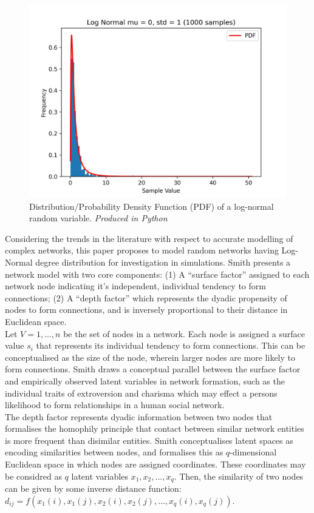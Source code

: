 \documentclass[
	a4paper, %
	10pt, %
	unnumberedsections, %
	twoside, %
]{LTJournalArticle}
\begin{document}
\begin{figure}[H] %
	\includegraphics[width=\linewidth]{Figures/ln/lognormal_dist.jpg}
	\caption{Distribution/Probability Density Function (PDF) of a log-normal random variable. \emph{Produced in Python}}
	\label{fig:lognormal_dist}
\end{figure}

Considering the trends in the literature with respect to accurate modelling of complex networks, this paper proposes to model random networks having Log-Normal degree distribution for investigation in simulations. Smith presents a network model with two core components: (1) A ``surface factor'' assigned to each network node indicating it's independent, individual tendency to form connections; (2) A ``depth factor'' which represents the dyadic propensity of nodes to form connections, and is inversely proportional to their distance in Euclidean space. \\ 

Let \(V = {1, ..., n} \) be the set of nodes in a network. Each node is assigned a surface value  \( s_{i} \) that represents its individual tendency to form connections. This can be conceptualised as the size of the node, wherein larger nodes are more likely to form connections. Smith draws a conceptual parallel between the surface factor and empirically observed latent variables in network formation, such as the individual traits of extroversion and charisma which may effect a persons likelihood to form relationships in a human social network. \\

The depth factor represents dyadic information between two nodes that formalises the homophily principle that contact between similar network entities is more frequent than disimilar entities. Smith conceptualises latent spaces as encoding similarities between nodes, and formalises this as \(q\)-dimensional Euclidean space in which nodes are assigned coordinates. These coordinates may be considred as \(q\) latent variables \(x_{1}, x_{2}, ..., x_{q}\). Then, the similarity of two nodes can be given by some inverse distance function: \(d_{ij} = f(x_{1}(i), x_{1}(j), x_{2}(i), x_{2}(j), ..., x_{q}(i), x_{q}(j)) \). \\
\end{document}
